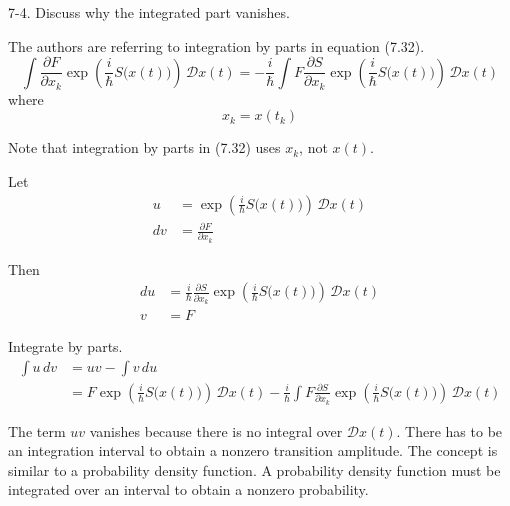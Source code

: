 \documentclass[12pt]{article}
\begin{document}
7-4.
Discuss why the integrated part vanishes.

\bigskip
The authors are referring to integration by parts in equation (7.32).
\begin{equation*}
\int\frac{\partial F}{\partial x_k}
\exp\left(\frac{i}{\hbar}S\big(x(t)\big)\right)\,\mathcal Dx(t)
=
-\frac{i}{\hbar}\int F\frac{\partial S}{\partial x_k}
\exp\left(\frac{i}{\hbar}S\big(x(t)\big)\right)\,\mathcal Dx(t)
\tag{7.32}
\end{equation*}
where
\begin{equation*}
x_k=x(t_k)
\end{equation*}

Note that integration by parts in (7.32) uses $x_k$, not $x(t)$.

\bigskip
Let
\begin{align*}
u&=\exp\left(\frac{i}{\hbar}S\big(x(t)\big)\right)\,\mathcal Dx(t)
\\
dv&=\frac{\partial F}{\partial x_k}
\end{align*}

Then
\begin{align*}
du&=\frac{i}{\hbar}
\frac{\partial S}{\partial x_k}
\exp\left(\frac{i}{\hbar}S\big(x(t)\big)\right)
\,\mathcal Dx(t)
\\
v&=F
\end{align*}

Integrate by parts.
\begin{align*}
\int u\,dv&=uv-\int v\,du
\\
&=F\exp\left(\frac{i}{\hbar}S\big(x(t)\big)\right)\,\mathcal Dx(t)
-\frac{i}{\hbar}\int F
\frac{\partial S}{\partial x_k}
\exp\left(\frac{i}{\hbar}S\big(x(t)\big)\right)
\,\mathcal Dx(t)
\end{align*}

The term $uv$ vanishes because there is no integral over $\mathcal Dx(t)$.
There has to be an integration interval to obtain a nonzero transition amplitude.
The concept is similar to a probability density function.
A probability density function must be integrated over an interval to obtain a nonzero probability.
\end{document}
